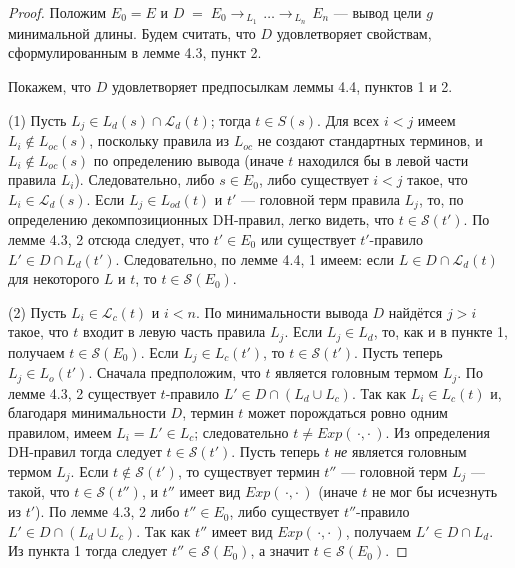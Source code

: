 \begin{proof}
Положим \(E_{0}=E\) и
\(
  D\;=\;
  E_{0}\rightarrow_{\,L_{1}\,}
  \dots
  \rightarrow_{\,L_{n}\,}E_{n}
\)
— вывод цели \(g\) минимальной длины.
Будем считать, что \(D\) удовлетворяет свойствам,
сформулированным в лемме 4.3, пункт 2.

Покажем, что \(D\) удовлетворяет предпосылкам леммы 4.4, пунктов 1 и 2.

(1)\quad
Пусть \(L_{j}\in L_{d}(s)\cap \mathcal L_{d}(t)\); тогда \(t\in S(s)\).
Для всех \(i<j\) имеем \(L_{i}\notin L_{oc}(s)\),
поскольку правила из \(L_{oc}\) не создают стандартных терминов,
и \(L_{i}\notin L_{oc}(s)\) по определению вывода  
(иначе \(t\) находился бы в левой части правила \(L_{i}\)).
Следовательно, либо \(s\in E_{0}\),
либо существует \(i<j\) такое, что \(L_{i}\in \mathcal L_{d}(s)\).
Если \(L_{j}\in L_{od}(t)\) и \(t'\) — головной терм правила \(L_{j}\),
то, по определению декомпозиционных DH-правил,
легко видеть, что \(t\in \mathcal S(t')\).
По лемме 4.3, 2 отсюда следует, что
\(t'\in E_{0}\) \;или\;
существует \(t'\)-правило \(L'\in D\cap L_{d}(t')\).
Следовательно, по лемме 4.4, 1 имеем:
если \(L\in D\cap \mathcal L_{d}(t)\) для некоторого \(L\) и \(t\),
то \(t\in \mathcal S(E_{0})\).

(2)\quad
Пусть \(L_i\in \mathcal L_{c}(t)\) и \(i<n\).
По минимальности вывода \(D\) найдётся \(j>i\) такое,
что \(t\) входит в левую часть правила \(L_j\).
Если \(L_j\in L_{d}\), то, как и в пункте 1,
получаем \(t\in \mathcal S(E_0)\).
Если \(L_j\in L_{c}(t')\), то \(t\in \mathcal S(t')\).
Пусть теперь \(L_j\in L_{o}(t')\).
Сначала предположим, что \(t\) является головным термом \(L_j\).
По лемме 4.3, 2 существует \(t\)-правило
\(L'\in D\cap(L_{d}\cup L_{c})\).
Так как \(L_i\in L_{c}(t)\) и, благодаря минимальности \(D\),
термин \(t\) может порождаться ровно одним правилом,
имеем \(L_i=L'\in L_{c}\); следовательно \(t\neq Exp(\,\cdot,\cdot\,)\).
Из определения DH-правил тогда следует \(t\in \mathcal S(t')\).
Пусть теперь \(t\) \emph{не} является головным термом \(L_j\).
Если \(t\notin \mathcal S(t')\), то существует термин \(t''\) —
головной терм \(L_j\) — такой, что \(t\in \mathcal S(t'')\),
и \(t''\) имеет вид \(Exp (\,\cdot,\cdot\,)\)
(иначе \(t\) не мог бы исчезнуть из \(t'\)).
По лемме 4.3, 2 либо \(t''\in E_0\),
либо существует \(t''\)-правило \(L'\in D\cap(L_{d}\cup L_{c})\).
Так как \(t''\) имеет вид \(Exp(\,\cdot,\cdot\,)\),
получаем \(L'\in D\cap L_{d}\).
Из пункта 1 тогда следует \(t''\in \mathcal S(E_0)\),
а значит \(t\in \mathcal S(E_0)\).
\end{proof}

